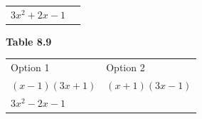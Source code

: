 {\begin{mdframed}[linewidth=4, leftmargin=40, rightmargin=40]
\begin{exercise}
\begin{enumerate}[noitemsep, label=\textbf{Step} \textbf{\arabic*}. ]
{{\begin{center}
\begin{tabular}[t]{|l|l|}
{                    $3{x}^{2}+2x-1$
                  }
     \tabularnewline\cline{1-1}\cline{2-2}
    \end{tabular}
      \end{center}
    \begin{center}{\small\bfseries Table 8.9}\end{center}
          }{ %
        \begin{center}
      \label{m39394*id277097}
    \noindent
      \tablelasttail{}
      \begin{xtabular}[t]{|l|l|}\hline
        Option 1 &
        Option 2%
     \tabularnewline{}
                  $\left(x-1\right)\left(3x+1\right)$
                 &
                  $\left(x+1\right)\left(3x-1\right)$
     \tabularnewline{}
                  $3{x}^{2}-2x-1$
                 &

\end{xtabular}
\end{center}}}
\end{enumerate}
\end{exercise}
\end{mdframed}}
